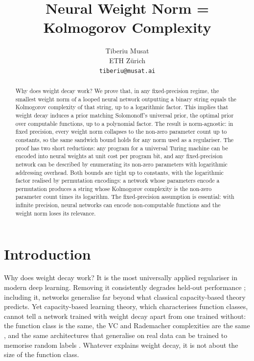 \documentclass{article}
\title{Neural Weight Norm = Kolmogorov Complexity}
\author{%
  Tiberiu Musat \\
  ETH Zürich \\
  \texttt{tiberiu@musat.ai}
}
\theoremstyle{definition}
\begin{document}
\maketitle

\begin{abstract}
  Why does weight decay work? We prove that, in any fixed-precision regime, the smallest weight norm of a looped neural network outputting a binary string equals the Kolmogorov complexity of that string, up to a logarithmic factor. This implies that weight decay induces a prior matching Solomonoff's universal prior, the optimal prior over computable functions, up to a polynomial factor. The result is norm-agnostic: in fixed precision, every weight norm collapses to the non-zero parameter count up to constants, so the same sandwich bound holds for any norm used as a regulariser. The proof has two short reductions: any program for a universal Turing machine can be encoded into neural weights at unit cost per program bit, and any fixed-precision network can be described by enumerating its non-zero parameters with logarithmic addressing overhead. Both bounds are tight up to constants, with the logarithmic factor realised by permutation encodings: a network whose parameters encode a permutation produces a string whose Kolmogorov complexity is the non-zero parameter count times its logarithm. The fixed-precision assumption is essential: with infinite precision, neural networks can encode non-computable functions and the weight norm loses its relevance.
\end{abstract}

\section{Introduction}\label{sec:intro}

Why does weight decay \citep{krogh1991simple} work? It is the most universally
applied regulariser in modern deep learning. Removing it consistently degrades
held-out performance \citep{andriushchenko2024why}; including it, networks
generalise far beyond what classical capacity-based theory predicts. Yet
capacity-based learning theory, which characterises function classes, cannot
tell a network trained with weight decay apart from one trained without: the
function class is the same, the VC and Rademacher complexities are the same
\citep{zhang2017understanding,nagarajan2019uniform}, and the same architectures
that generalise on real data can be trained to memorise random labels
\citep{zhang2017understanding}. Whatever explains weight decay, it is not about the size of the function class.
\end{document}
